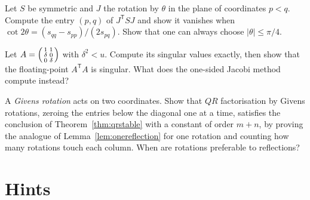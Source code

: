 \begin{exercise}[$\star$]\label{ex:jacobiangle}
Let $S$ be symmetric and $J$ the rotation by $\theta$ in the plane of coordinates $p<q$. Compute the entry $(p,q)$ of $J^{\mathsf T}SJ$ and show it vanishes
when $\cot2\theta=(s_{qq}-s_{pp})/(2s_{pq})$. Show that one can always choose $|\theta|\le\pi/4$.
\end{exercise}

\begin{exercise}[$\star\star$]\label{ex:squaring}
Let $A=\begin{psmallmatrix}1&1\\\delta&0\\0&\delta\end{psmallmatrix}$ with $\delta^2<u$. Compute its singular values exactly, then show that the
floating-point $A^{\mathsf T}A$ is singular. What does the one-sided Jacobi method compute instead?
\end{exercise}

\begin{exercise}[$\star\star\star$]\label{ex:givens}
A \emph{Givens rotation} acts on two coordinates. Show that $QR$ factorisation by Givens rotations, zeroing the entries below the diagonal one at a
time, satisfies the conclusion of Theorem~\ref{thm:qrstable} with a constant of order $m+n$, by proving the analogue of Lemma~\ref{lem:onereflection} for
one rotation and counting how many rotations touch each column. When are rotations preferable to reflections?
\end{exercise}

\section{Hints}


